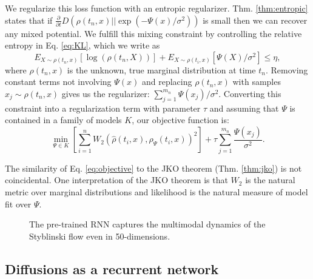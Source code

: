 \documentclass{article}
\begin{document}
We regularize this loss function with an entropic regularizer. Thm. \ref{thm:entropic} states that if $\frac{\partial}{\partial t} D(\rho(t_n,x)||\exp(-\Psi(x)/\sigma^2))$ is small then we can recover any mixed potential. We fulfill this mixing constraint by controlling the relative entropy in Eq. \ref{eq:KL}, which we write as
\[E_{X\sim\rho(t_n,x)}[\log(\rho(t_n,X))]+E_{X\sim\rho(t_i,x)}[\Psi(X)/\sigma^2] \leq \eta,\]
where $\rho(t_n,x)$ is the unknown, true marginal distribution at time $t_n$. Removing constant terms not involving $\Psi(x)$ and replacing $\rho(t_n,x)$ with samples $x_j \sim \rho(t_n,x)$ gives us the regularizer: $\sum_{j=1}^{m_n} \Psi(x_j)/\sigma^2$. Converting this constraint into a regularization term with parameter $\tau$ and assuming that $\Psi$ is contained in a family of models $K$, our objective function is:
\begin{equation}\label{eq:objective}
\min_{\Psi \in K} \left[\sum_{i=1}^n W_2(\hat{\rho}(t_i,x),\rho_{\Psi}(t_i,x))^2\right] + \tau \sum_{j=1}^{m_n} \frac{\Psi(x_j)}{\sigma^2}.
\end{equation}

The similarity of Eq. \ref{eq:objective} to the JKO theorem (Thm. \ref{thm:jko}) is not coincidental. One interpretation of the JKO theorem is that $W_2$ is the natural metric over marginal distributions and likelihood is the natural measure of model fit over $\Psi$.


\begin{figure*}[ht!]
\centering
{}
\quad
{}
\quad
{}
\vspace{-8pt}
\caption{The pre-trained RNN captures the multimodal dynamics of the Styblinski flow even in 50-dimensions.}
\vspace{-10pt}
\end{figure*}


\subsection{Diffusions as a recurrent network}
\end{document}
